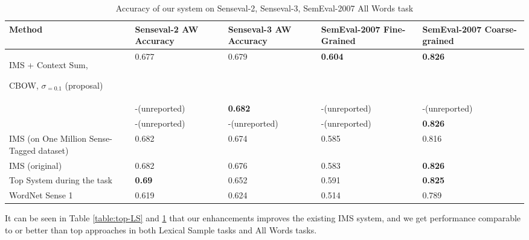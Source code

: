 \begin{table}
	\caption{Accuracy of our system on Senseval-2, Senseval-3, SemEval-2007 All Words task}
	\label{table:All-AW}
	\begin{center}
		\begin{tabular}{| p{4cm} | p{2cm} | p{3cm} | p{3cm} | p{3cm} | }
			\hline
			Method & Senseval-2 AW Accuracy & Senseval-3 AW Accuracy & SemEval-2007 Fine-Grained & SemEval-2007 Coarse-grained \\
			\hline
			IMS + Context Sum, 
			
			CBOW, $\sigma _{=0.1}$ (proposal) & 0.677 & 0.679 & {\bf0.604} & {\bf 0.826 } \\
			\hline
			
			\cite{Taghipour15} & -(unreported) & {\bf0.682} & -(unreported) & -(unreported) \\
			\hline
			\cite{chen2014} & -(unreported) & -(unreported) & -(unreported) & {\bf 0.826 } \\
			\hline
			IMS (on One Million Sense-Tagged dataset) & 0.682 & 0.674 & 0.585 & 0.816 \\
			\hline
			IMS (original) & 0.682 & 0.676 & 0.583 & {\bf 0.826 }  \\
			\hline
			Top System during the task & {\bf0.69} & 0.652 & 0.591 & {\bf 0.825 } \\
			\hline
			WordNet Sense 1 & 0.619 & 0.624 & 0.514 & 0.789\\
			\hline
		\end{tabular}
	\end{center}
\end{table}


It can be seen in Table \ref{table:top-LS} and \ref{table:All-AW} that our enhancements improves the existing IMS system, and we get performance comparable to or better than top approaches in both Lexical Sample tasks and All Words tasks. 

